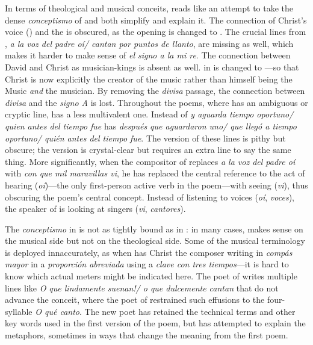 In terms of theological and musical conceits,  reads like an attempt
to take the dense \emph{conceptismo} of  and both simplify and explain it.
The connection of Christ's voice () and the  is obscured, as the opening is changed to .
The crucial lines from , \emph{a la voz del padre oí/ cantan por puntos de
llanto}, are missing as well, which makes it harder to make sense of \emph{el signo a
la mi re}.
The connection between David and Christ as musician-kings is absent as well.
 in  is changed to ---so
that Christ is now explicitly the creator of the music rather than himself being
the Music \emph{and} the musician.
By removing the \emph{divisa} passage, the connection between \emph{divisa} and
the \emph{signo A} is lost.
Throughout the poems, where  has an ambiguous or cryptic line, 
has a less multivalent one. 
Instead of \emph{y aguarda tiempo oportuno/ quien antes del tiempo fue} 
has \emph{después que aguardaron uno/ que llegó a tiempo oportuno/ quién antes
del tiempo fue}.
The  version of these lines is pithy but obscure; the 
version is crystal-clear but requires an extra line to say the same thing.
More significantly, when the compositor of  replaces \emph{a la voz del
padre oí} with \emph{con que mil maravillas vi}, he has replaced the central reference
to the act of hearing (\emph{oí})---the only first-person active verb in the
poem---with seeing (\emph{vi}), thus obscuring the poem's central concept. 
Instead of listening to voices (\emph{oí}, \emph{voces}), the speaker of  is
looking at singers (\emph{vi}, \emph{cantores}).

The \emph{conceptismo} in  is not as tightly bound as in : in many
cases,  makes sense on the musical side but not on the theological
side.
Some of the musical terminology is deployed innaccurately, as when 
has Christ the composer writing in \emph{compás mayor} in a \emph{proporción abreviada}
using a \emph{clave con tres tiempos}---it is hard to know which actual meters might
be indicated here.
The poet of  writes multiple lines like \emph{O que lindamente suenan!/ o
que dulcemente cantan} that do not advance the conceit, where the poet of
 restrained such effusions to the four-syllable \emph{O qué canto}.
The new poet has retained the technical terms and other key words used in the
first version of the poem, but has attempted to explain the metaphors, sometimes
in ways that change the meaning from the first poem.

